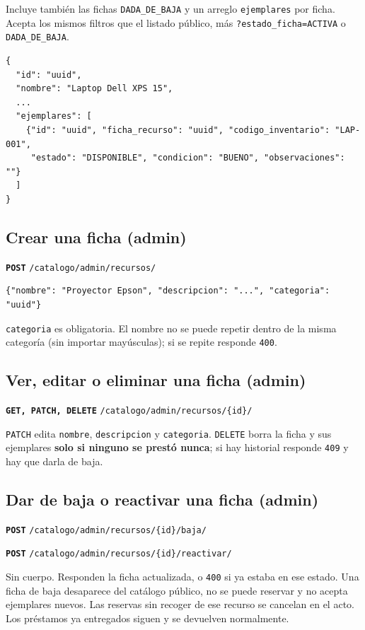 \documentclass[11pt]{article}
\newcommand{\us}{\_\allowbreak}
\newcommand{\metodo}[2]{\textbf{\texttt{#1}} \texttt{#2}}
\begin{document}
Incluye tambi\'en las fichas \texttt{DADA\us DE\us BAJA} y un arreglo \texttt{ejemplares} por ficha. Acepta los mismos filtros que el listado p\'ublico, m\'as \texttt{?estado\us ficha=ACTIVA} o \texttt{DADA\us DE\us BAJA}.
\begin{lstlisting}
{
  "id": "uuid",
  "nombre": "Laptop Dell XPS 15",
  ...
  "ejemplares": [
    {"id": "uuid", "ficha_recurso": "uuid", "codigo_inventario": "LAP-001",
     "estado": "DISPONIBLE", "condicion": "BUENO", "observaciones": ""}
  ]
}
\end{lstlisting}

\subsection*{Crear una ficha (admin)}
\metodo{POST}{/catalogo/admin/recursos/}
\begin{lstlisting}
{"nombre": "Proyector Epson", "descripcion": "...", "categoria": "uuid"}
\end{lstlisting}
\texttt{categoria} es obligatoria. El nombre no se puede repetir dentro de la misma categor\'ia (sin importar may\'usculas); si se repite responde \texttt{400}.

\subsection*{Ver, editar o eliminar una ficha (admin)}
\metodo{GET, PATCH, DELETE}{/catalogo/admin/recursos/\{id\}/}

\texttt{PATCH} edita \texttt{nombre}, \texttt{descripcion} y \texttt{categoria}. \texttt{DELETE} borra la ficha y sus ejemplares \textbf{solo si ninguno se prest\'o nunca}; si hay historial responde \texttt{409} y hay que darla de baja.

\subsection*{Dar de baja o reactivar una ficha (admin)}
\metodo{POST}{/catalogo/admin/recursos/\{id\}/baja/}

\metodo{POST}{/catalogo/admin/recursos/\{id\}/reactivar/}

Sin cuerpo. Responden la ficha actualizada, o \texttt{400} si ya estaba en ese estado. Una ficha de baja desaparece del cat\'alogo p\'ublico, no se puede reservar y no acepta ejemplares nuevos. Las reservas sin recoger de ese recurso se cancelan en el acto. Los pr\'estamos ya entregados siguen y se devuelven normalmente.
\end{document}
